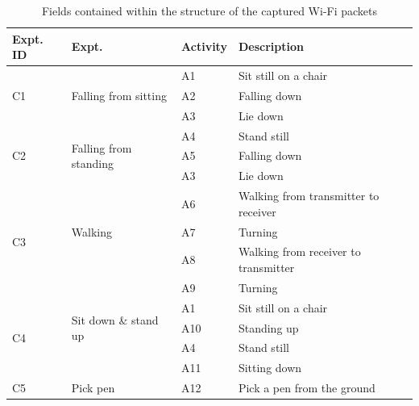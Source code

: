 \documentclass[conference]{IEEEtran}
\begin{document}
\begin{table}
\begin{center}
    \begin{tabular}{| m{0.5cm} | m{1.5cm}| m{0.75cm} | m{4cm} |}
    
    \hline
    Expt. ID & Expt. & Activity & Description\\ [1ex]
    \hline\hline
    \multirow{3}{3em}{C1}	& \multirow{3}{3em}{Falling from sitting}  & A1	& Sit still on a chair\\ [1ex]
        &                                & A2	& Falling down\\ [1ex]
        &                                & A3	& Lie down\\ [1ex]
    \hline
    \multirow{3}{2em}{C2}	& \multirow{3}{2em}{Falling from standing} & A4	& Stand still\\ [1ex]
        &                                & A5	& Falling down\\ [1ex]
        &                                & A3	& Lie down\\ [1ex]
    \hline
    \multirow{4}{4em}{C3}	& \multirow{3}{3em}{Walking}                & A6	& Walking from transmitter to receiver\\ [1ex]
        &                                & A7	& Turning\\ [1ex]
        &                                & A8	& Walking from receiver to transmitter\\ [1ex]
        &                                & A9	& Turning\\ [1ex]
    \hline
    \multirow{4}{4em}{C4}	& \multirow{3}{3em}{Sit down \& stand up}   & A1	& Sit still on a chair\\ [1ex]
        &                                & A10	& Standing up\\ [1ex]
        &                                & A4	& Stand still\\ [1ex]
        &                                & A11	& Sitting down\\ [1ex]
    \hline
                    C5	    & Pick pen	 & A12	& Pick a pen from the ground\\ [1ex]
    \hline\hline
    \end{tabular}
\end{center}
\caption{\label{tab:table_actions} Fields contained within the structure of the captured Wi-Fi packets}
\end{table}
\end{document}
